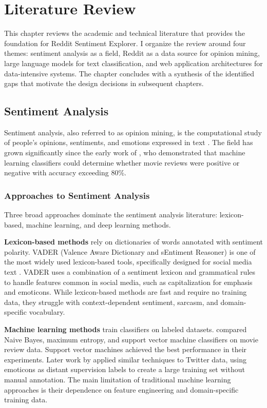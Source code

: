 \chapter{Literature Review}
\label{ch:literature_review}

This chapter reviews the academic and technical literature that provides the foundation for Reddit Sentiment Explorer. I organize the review around four themes: sentiment analysis as a field, Reddit as a data source for opinion mining, large language models for text classification, and web application architectures for data-intensive systems. The chapter concludes with a synthesis of the identified gaps that motivate the design decisions in subsequent chapters.

\section{Sentiment Analysis}
\label{sec:sentiment_analysis}

Sentiment analysis, also referred to as opinion mining, is the computational study of people's opinions, sentiments, and emotions expressed in text \cite{liu2012sentiment}. The field has grown significantly since the early work of , who demonstrated that machine learning classifiers could determine whether movie reviews were positive or negative with accuracy exceeding 80\%.

\subsection{Approaches to Sentiment Analysis}

Three broad approaches dominate the sentiment analysis literature: lexicon-based, machine learning, and deep learning methods.

\textbf{Lexicon-based methods} rely on dictionaries of words annotated with sentiment polarity. VADER (Valence Aware Dictionary and sEntiment Reasoner) is one of the most widely used lexicon-based tools, specifically designed for social media text \cite{hutto2014vader}. VADER uses a combination of a sentiment lexicon and grammatical rules to handle features common in social media, such as capitalization for emphasis and emoticons. While lexicon-based methods are fast and require no training data, they struggle with context-dependent sentiment, sarcasm, and domain-specific vocabulary.

\textbf{Machine learning methods} train classifiers on labeled datasets.  compared Naive Bayes, maximum entropy, and support vector machine classifiers on movie review data. Support vector machines achieved the best performance in their experiments. Later work by  applied similar techniques to Twitter data, using emoticons as distant supervision labels to create a large training set without manual annotation. The main limitation of traditional machine learning approaches is their dependence on feature engineering and domain-specific training data.

